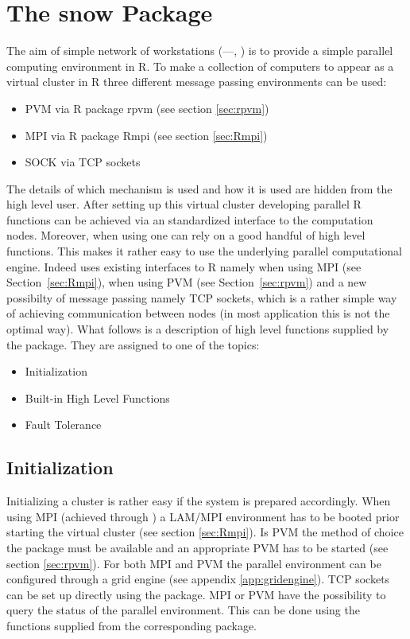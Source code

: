 \section{The snow Package}
\label{sec:snow}
The aim of simple network of workstations
(---\cite{rossini03snow}, \cite{tierney07snow}) is to
provide a simple parallel computing environment in R. To make a
collection of computers to appear as a virtual cluster in R 
three different message passing environments can be used:

\begin{itemize}
\item PVM via R package rpvm (see section \ref{sec:rpvm})
\item MPI via R package Rmpi (see section \ref{sec:Rmpi})
\item SOCK via TCP sockets
\end{itemize}

The details of which mechanism is used and how it is used are hidden
from the high level user.
After setting up this virtual cluster developing parallel R functions
can be achieved via an standardized interface to the computation
nodes.
Moreover, when using  one can rely on a good handful of
high level functions. This makes it rather easy to use the underlying
parallel computational engine.
Indeed  uses existing interfaces to R namely  when
using MPI (see Section~\ref{sec:Rmpi}),  when using PVM (see
Section~\ref{sec:rpvm}) and a new possibilty of message passing namely
TCP sockets, which is a rather simple way of achieving communication
between nodes (in most application this is not the optimal way).
What follows is a description of high level functions supplied by the
 package. They are assigned to one of the topics:

\begin{itemize}
\item Initialization
\item Built-in High Level Functions
\item Fault Tolerance
\end{itemize}

\subsection{Initialization}

Initializing a  cluster is rather easy if the system is
prepared accordingly. When using MPI (achieved through ) a
LAM/MPI environment has to be booted prior starting the virtual
cluster (see section \ref{sec:Rmpi}). Is PVM the method of choice the
 package must be available and an appropriate PVM has to be
started (see section \ref{sec:rpvm}). For both MPI and PVM the
parallel environment 
can be configured through a grid engine (see appendix
\ref{app:gridengine}). TCP sockets can be set up directly using the
package. MPI or PVM have the possibility to query the status of the
parallel environment. This can be done using the functions supplied
from the corresponding package.


